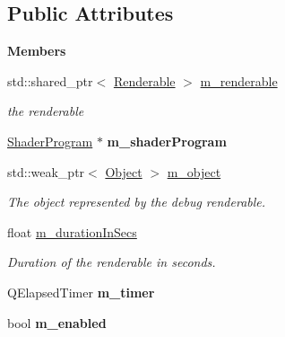 \subsection*{Public Attributes}
\begin{Indent}\textbf{ Members}\par
\begin{DoxyCompactItemize}
\item 
\mbox{\label{structrev_1_1_debug_manager_1_1_debug_renderable_add19e3d9463ea50f6763a54afbc61058}} 
std\+::shared\+\_\+ptr$<$ \mbox{\hyperlink{classrev_1_1_renderable}{Renderable}} $>$ \mbox{\hyperlink{structrev_1_1_debug_manager_1_1_debug_renderable_add19e3d9463ea50f6763a54afbc61058}{m\+\_\+renderable}}
\begin{DoxyCompactList}\small\item\em the renderable \end{DoxyCompactList}\item 
\mbox{\label{structrev_1_1_debug_manager_1_1_debug_renderable_add3f764f16444e8ed77cd3b8d4074357}} 
\mbox{\hyperlink{classrev_1_1_shader_program}{Shader\+Program}} $\ast$ {\bfseries m\+\_\+shader\+Program}
\item 
\mbox{\label{structrev_1_1_debug_manager_1_1_debug_renderable_ab5de96f7014bc2dac3a6510b7c96e591}} 
std\+::weak\+\_\+ptr$<$ \mbox{\hyperlink{classrev_1_1_object}{Object}} $>$ \mbox{\hyperlink{structrev_1_1_debug_manager_1_1_debug_renderable_ab5de96f7014bc2dac3a6510b7c96e591}{m\+\_\+object}}
\begin{DoxyCompactList}\small\item\em The object represented by the debug renderable. \end{DoxyCompactList}\item 
\mbox{\label{structrev_1_1_debug_manager_1_1_debug_renderable_a39e6406ab2024f93ef11b67434b03b8e}} 
float \mbox{\hyperlink{structrev_1_1_debug_manager_1_1_debug_renderable_a39e6406ab2024f93ef11b67434b03b8e}{m\+\_\+duration\+In\+Secs}}
\begin{DoxyCompactList}\small\item\em Duration of the renderable in seconds. \end{DoxyCompactList}\item 
\mbox{\label{structrev_1_1_debug_manager_1_1_debug_renderable_a806cef0a22e801d90e47aaa7da5576d1}} 
Q\+Elapsed\+Timer {\bfseries m\+\_\+timer}
\item 
\mbox{\label{structrev_1_1_debug_manager_1_1_debug_renderable_ac93ea57550f050ef7d670145a0f797ca}} 
bool {\bfseries m\+\_\+enabled}
\end{DoxyCompactItemize}
\end{Indent}


